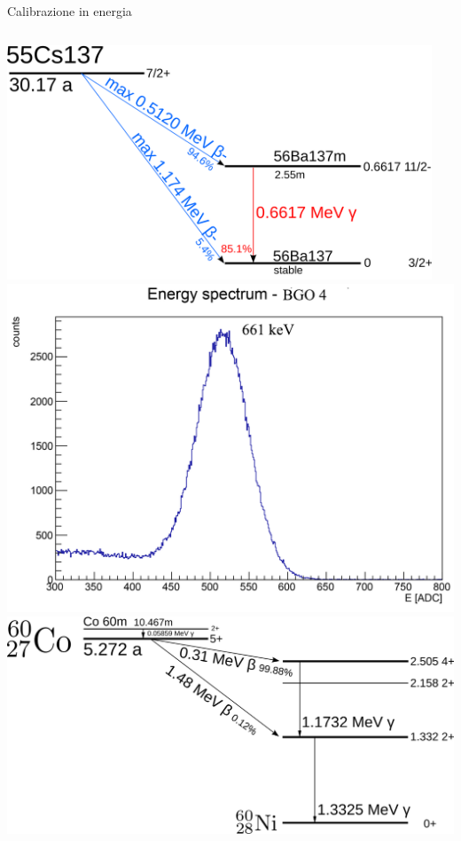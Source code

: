 \documentclass [xcolor=svgnames, 9pt] {beamer}
\begin{document}
\begin{frame}{Calibrazione in energia}
	\begin{columns}
		\centering
			\includegraphics[width=0.95\textwidth]{img/Cs-137-decay.png}
			\centering
			\includegraphics[width=\linewidth]{img/ex1776.pdf}
		\centering
			\includegraphics[width=\textwidth]{img/Cobalt-60m-decay.png}
			\centering

\end{columns}
\end{frame}
\end{document}

